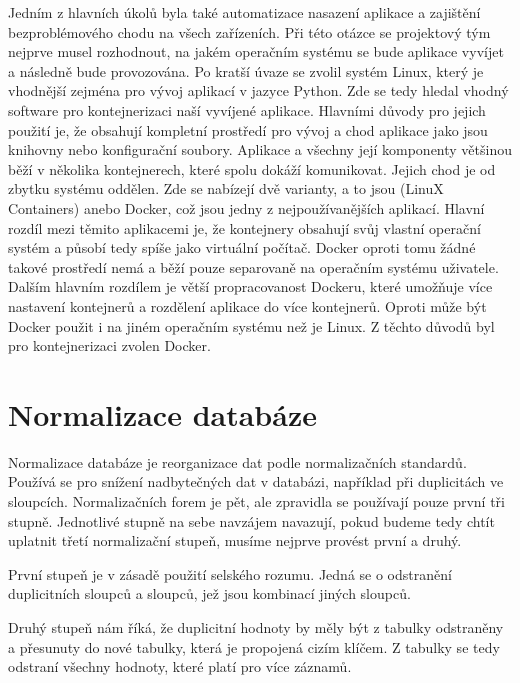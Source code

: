 Jedním z hlavních úkolů byla také automatizace nasazení aplikace a
zajištění bezpro\-blémového chodu na všech zařízeních. Při této otázce
se projektový tým nejprve musel rozhodnout, na jakém operačním systému se bude
aplikace vyvíjet a následně bude provozována. Po kratší úvaze se
zvolil systém Linux, který je vhodnější zejména pro vývoj aplikací v
jazyce Python. Zde se tedy hledal vhodný software pro
kontejnerizaci naší vyvíjené aplikace. Hlavními důvody pro jejich
použití je, že obsahují kompletní prostředí pro vývoj a chod aplikace
jako jsou knihovny nebo konfigurační soubory. Aplikace a všechny její
komponenty většinou běží v několika kontejnerech, které spolu dokáží
komunikovat. Jejich chod je od zbytku systému oddělen. Zde se nabízejí
dvě varianty, a to jsou  (LinuX Containers) anebo Docker, což jsou
jedny z nejpoužívanějších aplikací. Hlavní rozdíl mezi těmito
aplikacemi je, že kontejnery  obsahují svůj vlastní operační systém
a působí tedy spíše jako virtuální počítač. Docker oproti tomu žádné
takové prostředí nemá a běží pouze separovaně na operačním systému
uživatele. Dalším hlavním rozdílem je větší propracovanost Dockeru,
které umožňuje více nastavení kontejnerů a rozdělení aplikace do více
kontejnerů. Oproti  může být Docker použit i na
jiném operačním systému než je Linux. Z těchto důvodů byl pro
kontejnerizaci zvolen Docker. \cite{deployment}

\newpage

\section{Normalizace databáze}

Normalizace databáze je reorganizace dat podle normalizačních standardů. 
Používá se pro snížení nadbytečných dat v databázi, například při duplicitách 
ve sloupcích. Normalizačních forem je pět, ale zpravidla se používají pouze 
první tři stupně. Jednotlivé stupně na sebe navzájem navazují, pokud budeme 
tedy chtít uplatnit třetí normalizační stupeň, musíme nejprve provést první a druhý.

První stupeň je v zásadě použití selského rozumu. Jedná se o odstranění 
dupli\-citních sloupců a sloupců, jež jsou kombinací jiných sloupců.

Druhý stupeň nám říká, že duplicitní hodnoty by měly být z tabulky odstraněny 
a přesunuty do nové tabulky, která je propojená cizím klíčem. Z tabulky se tedy 
odstraní všechny hodnoty, které platí pro více záznamů.

